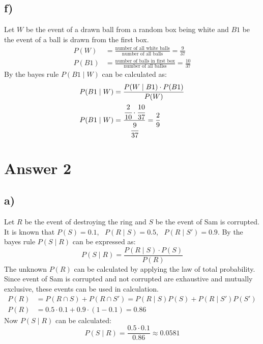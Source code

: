 \documentclass[12pt]{article}
\begin{document}
\subsection*{f)}
Let $W$ be the event of a drawn ball from a random box being white and $B1$ be the event of a ball is drawn from the first box.
\begin{align*}
    P(W) &= \frac{\text{number of all white balls}}{\text{number of all balls}} = \frac{9}{37}\\
    P(B1) &= \frac{\text{number of balls in first box}}{\text{number of all ballss}} = \frac{10}{37}
\end{align*}
By the bayes rule $P(B1 \mid W)$ can be calculated as:
\begin{align*}
    P(B1 \mid W) &= \frac{P(W \mid B1) \cdot P(B1)}{P(W)}\\
    P(B1 \mid W) &= \frac{\cfrac{2}{10} \cdot \cfrac{10}{37}}{\cfrac{9}{37}} = \frac{2}{9}\\
\end{align*}
\section*{Answer 2}
\subsection*{a)}
Let $R$ be the event of destroying the ring and $S$ be the event of Sam is corrupted. It is known that $P(S) = 0.1$, \ $P(R \mid S) = 0.5$, \ $P (R \mid S') = 0.9$. By the bayes rule $P(S \mid R)$ can be expressed as:
\begin{equation*}
    P(S \mid R) = \frac{P(R \mid S) \cdot P(S)}{P(R)}
\end{equation*}
The unknown $P(R)$ can be calculated by applying the law of total probability. Since event of Sam is corrupted and not corrupted are exhaustive and mutually exclusive, these events can be used in calculation.
\begin{align*}
    P(R) &= P(R \cap S) + P(R \cap S') = P(R \mid S)P(S) + P(R \mid S')P(S')\\
    P(R) &= 0.5 \cdot 0.1 + 0.9 \cdot (1-0.1) = 0.86
\end{align*} 
Now $P(S \mid R)$ can be calculated:
\begin{equation*}
    P(S \mid R) = \frac{0.5 \cdot 0.1}{0.86} \approx 0.0581
\end{equation*}
\end{document}
